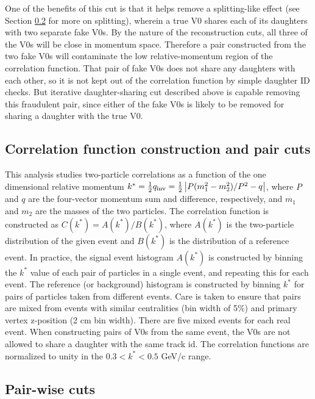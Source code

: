 
One of the benefits of this cut is that it helps remove a splitting-like effect (see Section \ref{sec:PairWiseCuts} for more on splitting), wherein a true V0 shares each of its daughters with two separate fake V0s.  
By the nature of the reconstruction cuts, all three of the V0s will be close in momentum space.  
Therefore a pair constructed from the two fake V0s will contaminate the low relative-momentum region of the correlation function.  
That pair of fake V0s does not share any daughters with each other, so it is not kept out of the correlation function by simple daughter ID checks.  
But iterative daughter-sharing cut described above is capable removing this fraudulent pair, since either of the fake V0s is likely to be removed for sharing a daughter with the true V0.


\subsection{Correlation function construction and pair cuts}
\label{sec:CFconstruct}

This analysis studies two-particle correlations as a function of the one dimensional relative momentum $k^*=\frac{1}{2}q_{\mathrm{inv}}=\frac{1}{2}\left\lvert P(m^2_1-m^2_2)/P^2 - q\right\rvert$, where $P$ and $q$ are the four-vector momentum sum and difference, respectively, and $m_1$ and $m_2$ are the masses of the two particles.  
The correlation function is constructed as $C(k^*) = A(k^*)/B(k^*)$, where $A(k^*)$ is the two-particle distribution of the given event and $B(k^*)$ is the distribution of a reference event.  
In practice, the signal event histogram $A(k^*)$ is constructed by binning the $k^*$ value of each pair of particles in a single event, and repeating this for each event.  
The reference (or background) histogram is constructed by binning $k^*$ for pairs of particles taken from different events.  
Care is taken to ensure that pairs are mixed from events with similar centralities (bin width of 5\%) and primary vertex z-position (2 cm bin width).  
There are five mixed events for each real event.  
When constructing pairs of V0s from the same event, the V0s are not allowed to share a daughter with the same track id. 
The correlation functions are normalized to unity in the $ 0.3 < k^* < 0.5$ GeV/c range.

\subsection{Pair-wise cuts}
\label{sec:PairWiseCuts}


